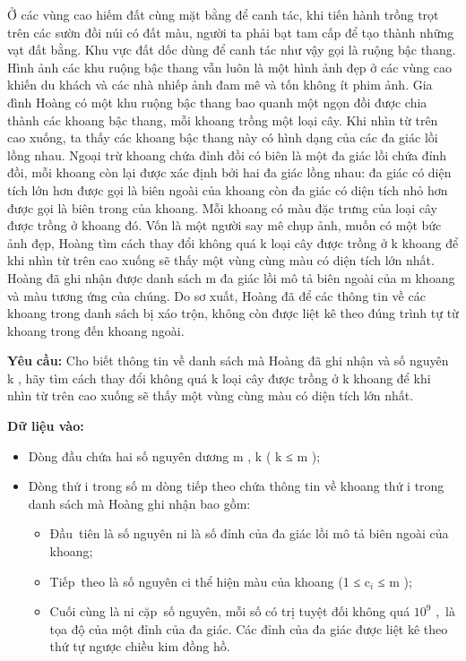 

Ở các vùng cao hiếm đất cùng mặt bằng để canh tác, khi tiến hành trồng trọt trên các sườn đồi núi có đất màu, người ta phải bạt tam cấp để tạo thành những vạt đất bằng. Khu vực đất dốc dùng để canh tác như vậy gọi là ruộng bậc thang. Hình ảnh các khu ruộng bậc thang vẫn luôn là một hình ảnh đẹp ở các vùng cao khiến du khách và các nhà nhiếp ảnh đam mê và tốn không ít phim ảnh. Gia đình Hoàng có một khu ruộng bậc thang bao quanh một ngọn đồi được chia thành các khoang bậc thang, mỗi khoang trồng một loại cây. Khi nhìn từ trên cao xuống, ta thấy các khoang bậc thang này có hình dạng của các đa giác lồi lồng nhau. Ngoại trừ khoang chứa đỉnh đồi có biên là một đa giác lồi chứa đỉnh đồi, mỗi khoang còn lại được xác định bởi hai đa giác lồng nhau: đa giác có diện tích lớn hơn được gọi là biên ngoài của khoang còn đa giác có diện tích nhỏ hơn được gọi là biên trong của khoang. Mỗi khoang có màu đặc trưng của loại cây được trồng ở khoang đó. Vốn là một người say mê chụp ảnh, muốn có một bức ảnh đẹp, Hoàng tìm cách thay đổi không quá k loại cây được trồng ở k khoang để khi nhìn từ trên cao xuống sẽ thấy một vùng cùng màu có diện tích lớn nhất. Hoàng đã ghi nhận được danh sách m đa giác lồi mô tả biên ngoài của m khoang và màu tương ứng của chúng. Do sơ xuất, Hoàng đã để các thông tin về các khoang trong danh sách bị xáo trộn, không còn được liệt kê theo đúng trình tự từ khoang trong đến khoang ngoài.

\textbf{Yêu }\textbf{}\textbf{ cầu: }\textbf{} Cho biết thông tin về danh sách mà Hoàng đã ghi nhận và số nguyên k , hãy tìm cách thay đổi không quá k loại cây được trồng ở k khoang để khi nhìn từ trên cao xuống sẽ thấy một vùng cùng màu có diện tích lớn nhất.

\textbf{Dữ liệu vào: }
\begin{itemize}
	\item Dòng đầu chứa hai số nguyên dương m , k ( k ≤ m );
	\item Dòng thứ i trong số m dòng tiếp theo chứa thông tin về khoang thứ i trong danh sách mà Hoàng ghi nhận bao gồm:
\begin{itemize}
	\item Đầu tiên là số nguyên ni là số đỉnh của đa giác lồi mô tả biên ngoài của khoang;
	\item Tiếp theo là số nguyên ci thể hiện màu của khoang (1 ≤ c$_ i $ ≤ m );
	\item Cuối cùng là ni cặp số nguyên, mỗi số có trị tuyệt đối không quá $10^{9}$ , là tọa độ của một đỉnh của đa giác. Các đỉnh của đa giác được liệt kê theo thứ tự ngược chiều kim đồng hồ.
\end{itemize}
\end{itemize}

